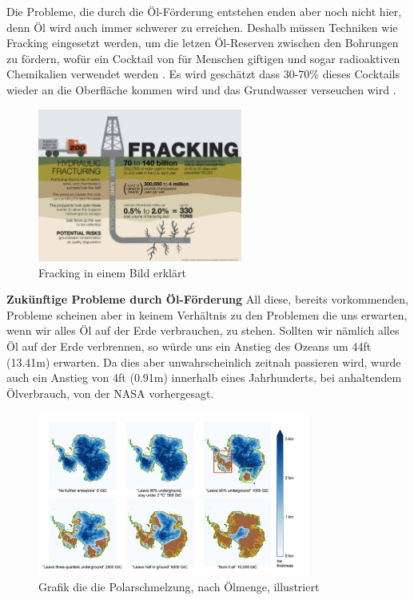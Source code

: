 Die Probleme, die durch die Öl-Förderung entstehen enden aber noch nicht hier, denn Öl wird auch immer schwerer zu erreichen. Deshalb müssen Techniken wie Fracking eingesetzt werden, um die letzen Öl-Reserven zwischen den Bohrungen zu fördern, wofür ein Cocktail von für Menschen giftigen und sogar radioaktiven Chemikalien verwendet werden \cite{SIMR.CH2-motorwirkungsgrad.FrackingChemicals}. Es wird geschätzt dass 30-70\% dieses Cocktails wieder an die Oberfläche kommen wird und das Grundwasser verseuchen wird \cite{SIMR.CH2-motorwirkungsgrad.FrackingGroundwater}.

\begin{figure}[!htb]\centering
	\includegraphics[width=0.6\textwidth]{images/frackingInfographic}
	\caption{Fracking in einem Bild erklärt \cite{SIMR.CH2-motorwirkungsgrad.frackingDescription}}\label{Fig:imgFrackingDesc}
\end{figure}

\newpage
\textbf{Zukünftige Probleme durch Öl-Förderung\nextline}
All diese, bereits vorkommenden, Probleme scheinen aber in keinem Verhältnis zu den Problemen die uns erwarten, wenn wir alles Öl auf der Erde verbrauchen, zu stehen. Sollten wir nämlich alles Öl auf der Erde verbrennen, so würde uns ein Anstieg des Ozeans um 44ft (13.41m) erwarten. \cite{SIMR.CH2-motorwirkungsgrad.SeaLevelRiseAllOilBurnt} Da dies aber unwahrscheinlich zeitnah passieren wird, wurde auch ein Anstieg von 4ft (0.91m) innerhalb eines Jahrhunderts, bei anhaltendem Ölverbrauch, von der NASA vorhergesagt. \cite{SIMR.CH2-motorwirkungsgrad.SeaLevelRiseCentury}

\begin{figure}[!htb]\centering
	\includegraphics[width=0.8\textwidth]{images/greenlandSeaLevel}
	\caption{Grafik die die Polarschmelzung, nach Ölmenge, illustriert \cite{SIMR.CH2-motorwirkungsgrad.SeaLevelRiseAllOilBurnt}}\label{Fig:imgGreenlandMelting}
\end{figure}

